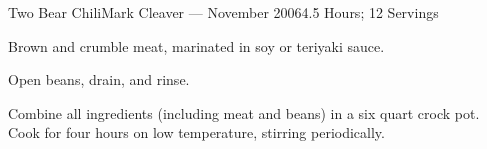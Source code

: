 \documentclass{article}
\begin{document}
\begin{recipe}{Two Bear Chili}{Mark Cleaver --- November 2006}{4.5 Hours; 12 Servings}

   Brown and crumble meat, marinated in soy or teriyaki sauce.

   Open beans, drain, and rinse.

   Combine all ingredients (including meat and beans) in a six quart crock pot.
   Cook for four hours on low temperature, stirring periodically.


\end{recipe}
\end{document}
